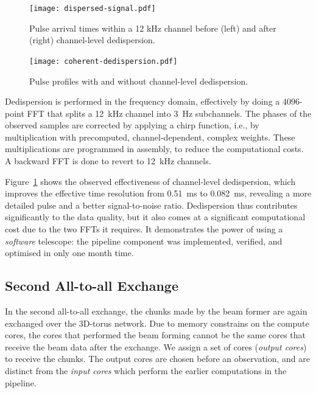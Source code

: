 \documentclass{llncs}
\begin{document}
\begin{figure}[ht]
\begin{minipage}[t]{0.60\textwidth}
\center
\texttt{[image: dispersed-signal.pdf]}
\caption{Pulse arrival times within a 12 kHz channel before (left) and after (right) channel-level dedispersion.}
\label{fig:dispersed-signal}
\end{minipage}
\hfill
\begin{minipage}[t]{0.35\textwidth}
\center
\texttt{[image: coherent-dedispersion.pdf]}
\caption{Pulse profiles with and without channel-level dedispersion.}
\label{fig:dedispersion-result}
\end{minipage}
\end{figure}

Dedispersion is performed in the frequency domain, effectively by doing a 4096-point FFT that splits a 12~kHz channel into 3~Hz subchannels. The phases of the observed samples are corrected by applying a chirp function, i.e., by multiplication with precomputed, channel-dependent, complex weights. These multiplications are programmed in assembly, to reduce the computational costs. A backward FFT is done to revert to 12~kHz channels.

Figure~\ref{fig:dedispersion-result} shows the observed effectiveness of channel-level dedispersion, which improves the effective time resolution from 0.51~ms to 0.082~ms, revealing a more detailed pulse and a better signal-to-noise ratio. Dedispersion thus contributes significantly to the data quality, but it also comes at a significant computational cost due to the two FFTs it requires. It demonstrates the power of using a \emph{software\/} telescope: the pipeline component was implemented, verified, and optimised in only one month time.

\subsection{Second All-to-all Exchange}

In the second all-to-all exchange, the chunks made by the beam former are again exchanged over the 3D-torus network. Due to memory constrains on the compute cores, the cores that performed the beam forming cannot be the same cores that receive the beam data after the exchange. We assign a set of cores (\emph{output cores}) to receive the chunks. The output cores are chosen before an observation, and are distinct from the \emph{input cores} which perform the earlier computations in the pipeline.
\end{document}
